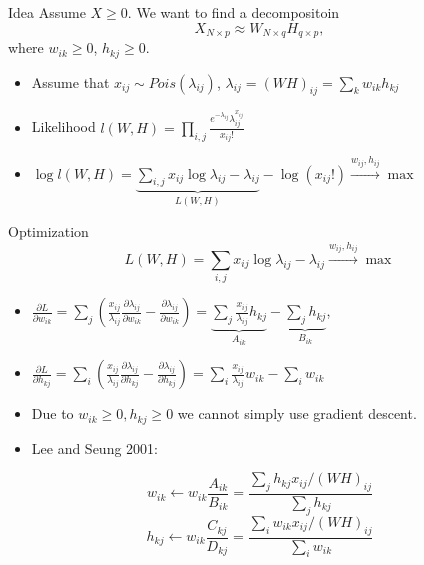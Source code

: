 \documentclass[aspectratio=169,t]{beamer}
\begin{document}
\begin{frame}{Idea}
Assume $X \geq 0$. We want to find a decompositoin
$$X_{N\times p} \approx W_{N\times q}H_{q\times p},$$
where $w_{ik} \geq 0$, $h_{kj} \geq 0$.
\begin{itemize}
  \item Assume that $x_{ij} \sim Pois(\lambda_{ij})$, $\lambda_{ij}=(WH)_{ij}=\sum\limits_{k}w_{ik}h_{kj}$
  \item Likelihood $l(W, H) = \prod\limits_{i,j} \frac{e^{-\lambda_{ij}} \lambda_{ij}^{x_{ij}}}{x_{ij}!}$
  \item $\log l(W, H) = \underbrace{\sum\limits_{i,j} x_{ij}\log{\lambda_{ij}} - \lambda_{ij}}_{L(W, H)} - \log(x_{ij}!) \xrightarrow{w_{ij}, h_{ij}} \max$
\end{itemize}
\end{frame}

\begin{frame}{Optimization}
$$L(W, H) = \sum\limits_{i,j} x_{ij}\log{\lambda_{ij} - \lambda_{ij}} \xrightarrow{w_{ij}, h_{ij}} \max$$
\begin{itemize}
  \item $\frac{\partial L}{\partial w_{ik}} = \sum\limits_{j} \left(\frac{x_{ij}}{\lambda_{ij}}\frac{\partial \lambda_{ij}}{\partial w_{ik}} - \frac{\partial \lambda_{ij}}{\partial w_{ik}}\right) = \underbrace{\sum\limits_{j} \frac{x_{ij}}{\lambda_{ij}}h_{kj}}_{A_{ik}} - \underbrace{\sum\limits_{j} h_{kj}}_{B_{ik}}$,
  \item $\frac{\partial L}{\partial h_{kj}} = \sum\limits_{i} \left(\frac{x_{ij}}{\lambda_{ij}}\frac{\partial \lambda_{ij}}{\partial h_{kj}} - \frac{\partial \lambda_{ij}}{\partial h_{kj}}\right) = \sum\limits_{i} \frac{x_{ij}}{\lambda_{ij}} w_{ik} - \sum\limits_{i}w_{ik}$
  \item Due to $w_{ik}\geq 0, h_{kj}\geq 0$ we cannot simply use gradient descent.
  \item Lee and Seung 2001: 
\end{itemize}
$$w_{ik} \leftarrow w_{ik}\frac{A_{ik}}{B_{ik}} = \frac{\sum_{j} h_{kj}x_{ij} / (WH)_{ij}}{\sum_{j} h_{kj}}$$
$$h_{kj} \leftarrow w_{ik}\frac{C_{kj}}{D_{kj}} = \frac{\sum_{i} w_{ik}x_{ij} / (WH)_{ij}}{\sum_{i} w_{ik}}$$
\end{frame}
\end{document}
